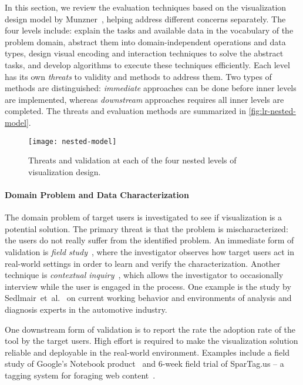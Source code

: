 In this section, we review the evaluation techniques based on the visualization design model by Munzner~\cite{Munroe2009}, helping address different concerns separately. The four levels include: explain the tasks and available data in the vocabulary of the problem domain, abstract them into domain-independent operations and data types, design visual encoding and interaction techniques to solve the abstract tasks, and develop algorithms to execute these techniques efficiently. Each level has its own \emph{threats} to validity and methods to address them. Two types of methods are distinguished: \emph{immediate} approaches can be done before inner levels are implemented, whereas \emph{downstream} approaches requires all inner levels are completed. The threats and evaluation methods are summarized in \autoref{fig:lr-nested-model}.

\begin{figure}[!htb]
	\centering
	\texttt{[image: nested-model]}
	\caption{Threats and validation at each of the four nested levels of visualization design. }
	\label{fig:lr-nested-model}
\end{figure}

\paragraph{Domain Problem and Data Characterization}
The domain problem of target users is investigated to see if visualization is a potential solution. The primary threat is that the problem is mischaracterized: the users do not really suffer from the identified problem. An immediate form of validation is \emph{field study}~\cite{Carpendale2008}, where the investigator observes how target users act in real-world settings in order to learn and verify the characterization. Another technique is \emph{contextual inquiry}~\cite{Holtzblatt1993}, which allows the investigator to occasionally interview while the user is engaged in the process. One example is the study by Sedlmair~et~al.~\cite{Sedlmair2008} on current working behavior and environments of analysis and diagnosis experts in the automotive industry.

One downstream form of validation is to report the rate the adoption rate of the tool by the target users. High effort is required to make the visualization solution reliable and deployable in the real-world environment. Examples include a field study of Google's Notebook product~\cite{Russell2008} and 6-week field trial of SparTag.us -- a tagging system for foraging web content~\cite{Hong2008}.

